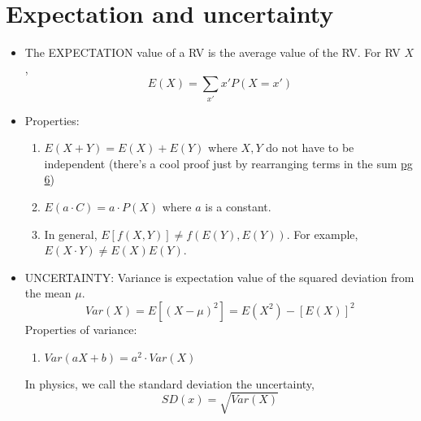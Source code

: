 \documentclass[12pt]{article}
\numberwithin{equation}{section}
\begin{document}
\section{Expectation and uncertainty}
\begin{itemize}
	\item The EXPECTATION value of a RV is the average value of the RV. For RV $ X $,
	\begin{equation}
			E(X) = \sum_{x'} x' P(X=x')
	\end{equation}
	\item Properties:
	\begin{enumerate}
		\item $ E(X+Y)  = E(X) + E(Y)$ where $ X,Y $ do not have to be independent (there's a cool proof just by rearranging terms in the sum \href{https://www.ocf.berkeley.edu/~yizhu/static/notes/stat_134_review.pdf}{pg 6}) 
		\item $ E(a\cdot C)  = a\cdot P(X)$ where $ a $ is a constant.
		\item In general, $ E[f(X,Y)] \neq f(E(Y), E(Y))$. For example, $ E(X\cdot Y)\neq E(X)E(Y) $.
	\end{enumerate}
	\item UNCERTAINTY: Variance is expectation value of the squared deviation from the mean $ \mu $.
	\begin{equation}
			Var(X) = E[(X-\mu)^2] = E(X^2) - [E(X)]^2
	\end{equation}
	Properties of variance:
	\begin{enumerate}
		\item $ Var(a X + b) =a^2\cdot Var(X)$ 
	\end{enumerate}
	In physics, we call the standard deviation the uncertainty,
	\begin{equation}
			SD(x) = \sqrt{Var(X)}
	\end{equation}
\end{itemize}
\end{document}
